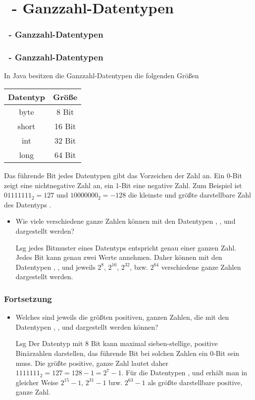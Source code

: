 \def\stitle{\theexercise\ - Ganzzahl-Datentypen}
\section{\stitle}
\begin{frame}%
  \frametitle{\stitle}
\tableofcontents[current]
\end{frame}

\begin{frame}[fragile]%
    \frametitle{\stitle}%

In Java besitzen die Ganzzahl-Datentypen die folgenden Größen
\begin{center}
\begin{tabular}{|c|c|}
\hline
\textbf{Datentyp} & \textbf{Größe} \\
\hline
byte  &  8 Bit \\
short & 16 Bit \\
int   & 32 Bit \\
long  & 64 Bit \\
\hline
\end{tabular}
\end{center}
Das führende Bit jedes Datentypen gibt das Vorzeichen der Zahl an.
Ein 0-Bit zeigt eine nichtnegative Zahl an, ein 1-Bit eine negative Zahl.
Zum Beispiel ist $0111 1111_2=127$ und $1000 0000_2 = -128$ die kleinste und größte darstellbare Zahl des Datentyps .
\begin{itemize}
\item Wie viele verschiedene ganze Zahlen können mit den Datentypen , ,  und  dargestellt werden?

\item[Lsg]
jedes Bitmuster eines Datentyps entspricht genau einer ganzen Zahl.
Jedes Bit kann genau zwei Werte annehmen.
Daher können mit den Datentypen , ,  und  jeweils $2^8$, $2^{16}$, $2^{32}$, bzw. $2^{64}$ verschiedene ganze Zahlen dargestellt werden.

\end{itemize}

\end{frame}

\begin{frame}[fragile]%
  \frametitle{Fortsetzung}%
\centering
\medskip

\begin{itemize}
\item
Welches sind jeweils die größten positiven, ganzen Zahlen, die mit den Datentypen , ,  und  dargestellt werden können?
\item[Lsg]
Der Datentyp  mit 8 Bit kann maximal sieben-stellige, positive Binärzahlen darstellen, das führende Bit bei solchen Zahlen ein 0-Bit sein muss.
Die größte positive, ganze Zahl lautet daher $1111111_2 = 127 = 128 - 1 = 2^7 - 1$.
Für die Datentypen ,  und  erhält man in gleicher Weise $2^{15} - 1$, $2^{31} - 1$ bzw. $2^{63} - 1$ als größte darstellbare positive, ganze Zahl.
\end{itemize}

\end{frame}

